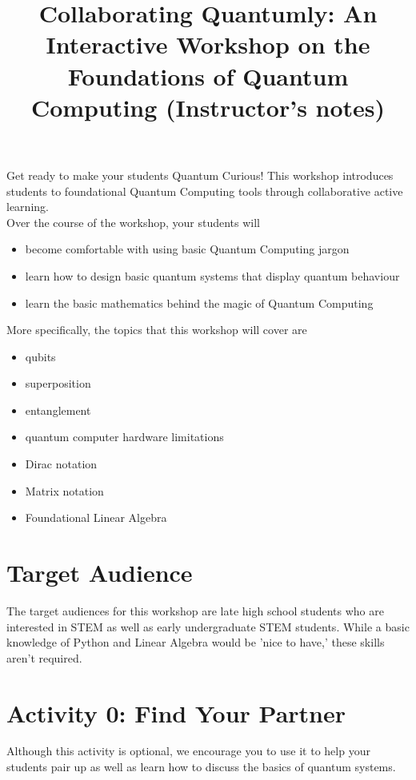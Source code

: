 \documentclass{article}
\title{Collaborating Quantumly: An Interactive Workshop on the Foundations of Quantum Computing (Instructor's notes)}
\begin{document}
\maketitle

Get ready to make your students Quantum Curious! This workshop introduces students to foundational Quantum Computing tools through collaborative active learning.
\\
Over the course of the workshop, your students will
\begin{itemize}
    \item become comfortable with using basic Quantum Computing jargon
    \item learn how to design basic quantum systems that display quantum behaviour
    \item learn the basic mathematics behind the magic of Quantum Computing
\end{itemize}

\newline \newline

More specifically, the topics that this workshop will cover are
\begin{itemize}
    \item qubits
    \item superposition
    \item entanglement
    \item quantum computer hardware limitations
    \item Dirac notation
    \item Matrix notation
    \item Foundational Linear Algebra
\end{itemize}

\section{Target Audience}

The target audiences for this workshop are late high school students who are interested in STEM as well as early undergraduate STEM students. While a basic knowledge of Python and Linear Algebra would be 'nice to have,' these skills aren't required.

\section{Activity 0: Find Your Partner}

Although this activity is optional, we encourage you to use it to help your students pair up as well as learn how to discuss the basics of quantum systems.
\end{document}
